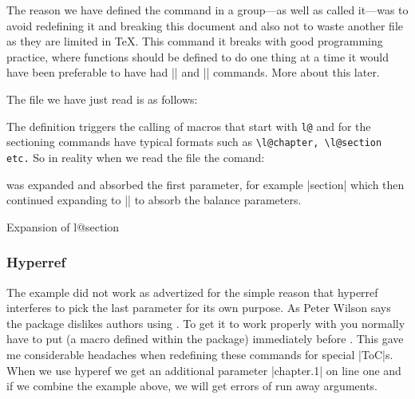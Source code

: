 
The reason we have defined the command in a group---as well as called it---was to avoid redefining it and breaking this document and also not to waste another file as they are limited in TeX. This command it breaks with good programming practice, where functions should be defined to do one thing at a time it would have been preferable to have had |\@readtoc| and  |\@writetoc| commands. More about this later.

The file we have just read is as follows:

\begin{teXXX}
\end{teXXX}

The  definition triggers the calling of macros that start with \verb+l@+ and for the sectioning commands have typical formats such as \lstinline{\l@chapter, \l@section etc.} So in reality when we read the
file the comand:
\begin{teX}
\def\contentsline#1{\csname l@#1\endcsname}
\end{teX}
was expanded and absorbed the first parameter, for example |{section}| which then continued expanding to |\l@section| to absorb the balance parameters.

\begin{texexample}{Expansion of l@section}{}
\makeatletter
{}
\makeatother
\end{texexample}

\subsubsection{Hyperref}

The example did not work as advertized for the simple reason that hyperref interferes to pick the last parameter for its own purpose. As Peter Wilson says the  package dislikes authors using
. To get it to work properly with   you normally have to put  (a macro defined within  the  package) immediately  before . This gave me considerable headaches when redefining these commands for special |ToC|s.
When we use hyperef we get an additional parameter |chapter.1| on line one and if we combine the example above, we will get errors of run away arguments.

